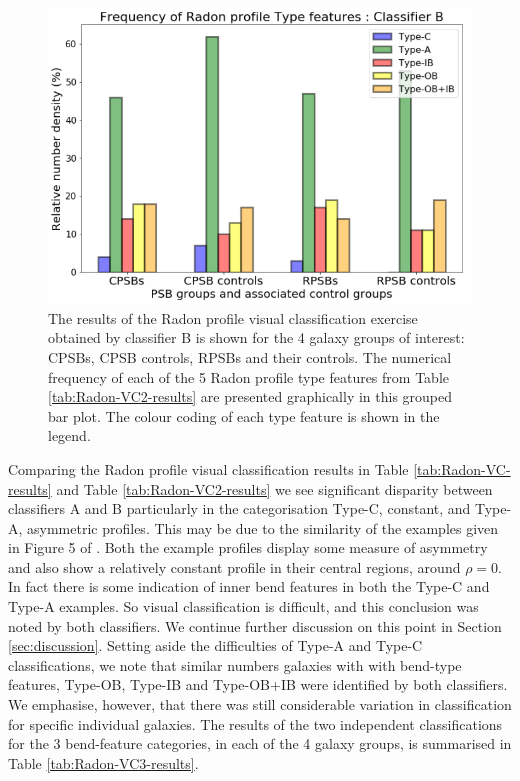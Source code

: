 \begin{figure}
    \centering
    \includegraphics[width=\columnwidth]{images/JupyterPlots/PROFILE-TYPES-CLASSIFIER-B.png}
    \caption[Radon profile Type classifications determined by classifier B]{The results of the Radon profile visual classification exercise obtained by classifier B is shown for the 4 galaxy groups of interest: CPSBs, CPSB controls, RPSBs and their controls. The numerical frequency of each of the 5 Radon profile type features from Table \ref{tab:Radon-VC2-results} are presented graphically in this grouped bar plot. The colour coding of each type feature is shown in the legend.}
    \label{fig:Radon-grouped-barchart-B}
\end{figure}

Comparing the Radon profile visual classification results in Table \ref{tab:Radon-VC-results} and Table \ref{tab:Radon-VC2-results} we see significant disparity between classifiers A and B particularly in the categorisation Type-C, constant, and Type-A, asymmetric profiles. This may be due to the similarity of the examples given in Figure 5 of \cite{2018MNRAS.480.2217S}. Both the example profiles display some measure of asymmetry and also show a relatively constant profile in their central regions, around $\rho=0$. In fact there is some indication of inner bend features in both the Type-C and Type-A examples. So visual classification is difficult, and this conclusion was noted by both classifiers. We continue further discussion on this point in Section \ref{sec:discussion}. Setting aside the difficulties of Type-A and Type-C classifications, we note that similar numbers galaxies with with bend-type features, Type-OB, Type-IB and Type-OB+IB were identified by both classifiers. We emphasise, however, that there was still considerable variation in classification for specific individual galaxies. The results of the two independent classifications for the 3 bend-feature categories, in each of the 4 galaxy groups, is summarised in Table \ref{tab:Radon-VC3-results}.

